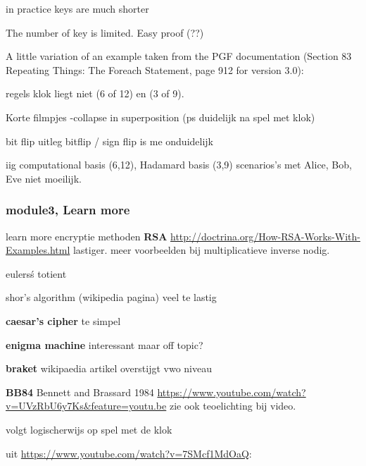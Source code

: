 in practice keys are much shorter

The number of key is limited. Easy proof (??)




A little variation of an example taken from the PGF documentation (Section 83 Repeating Things: The Foreach Statement, page 912 for version 3.0):


 
regels klok liegt niet (6 of 12) en (3 of 9).

Korte filmpjes 
-collapse in superposition (ps duidelijk na spel met klok) 

bit flip uitleg bitflip / sign flip is me onduidelijk

iig computational basis (6,12), Hadamard basis (3,9)
scenarios's met Alice, Bob, Eve
niet moeilijk.

\subsubsection*{module3, Learn more}

learn more encryptie methoden 
\textbf{RSA} \url{http://doctrina.org/How-RSA-Works-With-Examples.html} lastiger. 
meer voorbeelden bij multiplicatieve inverse nodig.

eulers\'s totient

shor's algorithm (wikipedia pagina) veel te lastig

\textbf{caesar's cipher} te simpel

\textbf{enigma machine} interessant maar off topic?

\textbf{braket} wikipaedia artikel overstijgt vwo niveau

\textbf{BB84} Bennett and Brassard 1984 \url{https://www.youtube.com/watch?v=UVzRbU6y7Ks&feature=youtu.be} zie ook teoelichting bij video.

volgt logischerwijs op spel met de klok

uit \url{https://www.youtube.com/watch?v=7SMcf1MdOaQ}:

